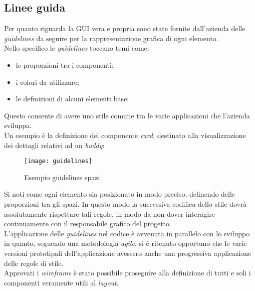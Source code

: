 \subsection{Linee guida}
Per quanto riguarda la GUI vera e propria sono state fornite dall'azienda delle 
\emph{guidelines} da seguire per la rappresentazione grafica di ogni elemento. \\
Nello specifico le \emph{guidelines} toccano temi come:
\begin{itemize}
	\item le proporzioni tra i componenti;
	\item i colori da utilizzare;
	\item le definizioni di alcuni elementi base;
\end{itemize}
Questo consente di avere uno stile comune tra le varie applicazioni che 
l'azienda sviluppa. \\
Un esempio è la definizione del componente \emph{card}, destinato alla 
visualizzazione dei dettagli relativi ad un \emph{buddy}:
\begin{figure}[H] 
	\centering
	\texttt{[image: guidelines]}
	\caption{Esempio guidelines spazi}
\end{figure}
Si noti come ogni elemento sia posizionato in modo preciso, definendo delle 
proporzioni tra gli spazi. In questo modo la successiva codifica dello stile
dovrà assolutamente rispettare tali regole, in modo da non dover interagire
continuamente con il responsabile grafico del progetto. \\
L'applicazione delle \emph{guidelines} nel codice è avvenuta in parallelo con lo sviluppo 
in quanto, seguendo una metodologia \emph{agile}, si è ritenuto opportuno che le varie 
versioni prototipali dell'applicazione avessero anche una progressiva applicazione 
delle regole di stile.\\
Approvati i \emph{wireframe} è stato possibile proseguire alla definizione di tutti 
e soli i componenti veramente utili al \emph{layout}.
\newpage
